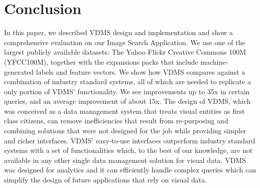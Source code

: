 \section{Conclusion}
In this paper, we described VDMS design and implementation and 
show a comprehensive evaluation on our Image Search Application. 
We use one of the largest publicly available datasets: 
The Yahoo Flickr Creative Commons 100M (YFCC100M), 
together with the expansions packs that include 
machine-generated labels and feature vectors.
We show how VDMS compares against a combination of 
industry standard systems, all of which are needed to 
replicate a only portion of VDMS' functionality. 
We see improvements up to 35x in certain queries, 
and an average improvement of about 15x. 
The design of VDMS, which was conceived as a 
data management system that treats visual entities 
as first class citizens, can remove inefficiencies 
that result from re-purposing and combining solutions
that were not designed for the job while providing 
simpler and richer interfaces. 
VDMS' easy-to-use interfaces outperform industry standard systems
with a set of functionalities which, to the best of our knowledge,
are not available in any other single data management solution for visual data.
VDMS was designed for analytics and it can efficiently handle complex queries 
which can simplify the design of future applications that rely on visual data.
